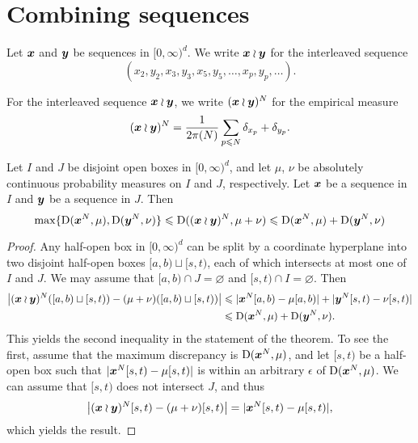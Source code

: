 \section{Combining sequences}

\begin{definition}
Let ${\boldsymbol x}$ and ${\boldsymbol y}$ be sequences in $[0,\infty)^d$. We write ${\boldsymbol x}\wr{\boldsymbol y}$ for 
the interleaved sequence 
\[
	(x_2,y_2,x_3,y_3,x_5,y_5,\dots,x_p,y_p,\dots) .
\]
\end{definition}

For the interleaved sequence ${\boldsymbol x}\wr{\boldsymbol y}$, we write $({\boldsymbol x}\wr{\boldsymbol y})^N$ for the 
empirical measure 
\[
	({\boldsymbol x}\wr{\boldsymbol y})^N = \frac{1}{2\pi(N)} \sum_{p\leqslant N} \delta_{x_p} + \delta_{y_p} .
\]

\begin{theorem}\label{thm:wreath-seq}
Let $I$ and $J$ be disjoint open boxes in $[0,\infty)^d$, and let $\mu$, 
$\nu$ be absolutely continuous probability measures on $I$ and $J$, 
respectively. Let ${\boldsymbol x}$ be a sequence in $I$ and ${\boldsymbol y}$ be a sequence in $J$. 
Then 
\[
	\max\{\operatorname{D}({\boldsymbol x}^N,\mu),\operatorname{D}({\boldsymbol y}^N,\nu)\} \leqslant \operatorname{D}(({\boldsymbol x}\wr{\boldsymbol y})^N, \mu+\nu) \leqslant \operatorname{D}({\boldsymbol x}^N,\mu) + \operatorname{D}({\boldsymbol y}^N,\nu)
\]
\end{theorem}
\begin{proof}
Any half-open box in $[0,\infty)^d$ can be split by a coordinate 
hyperplane into two disjoint half-open boxes $[a,b)\sqcup [s,t)$, each of which 
intersects at most one of $I$ and $J$. We may assume that 
$[a,b)\cap J=\varnothing$ and $[s,t)\cap I = \varnothing$. Then 
\begin{align*}
	\left| ({\boldsymbol x}\wr{\boldsymbol y})^N([a,b)\sqcup [s,t)) - (\mu+\nu)([a,b)\sqcup[s,t))\right| 
		&\leqslant |{\boldsymbol x}^N[a,b) - \mu[a,b)| + |{\boldsymbol y}^N[s,t) - \nu[s,t)| \\
		&\leqslant \operatorname{D}({\boldsymbol x}^N,\mu) + \operatorname{D}({\boldsymbol y}^N,\nu) .
\end{align*}
This yields the second inequality in the statement of the theorem. To see the 
first, assume that the maximum discrepancy is $\operatorname{D}({\boldsymbol x}^N,\mu)$, and let 
$[s,t)$ be a half-open box such that $|{\boldsymbol x}^N[s,t) - \mu[s,t)|$ is within an 
arbitrary $\epsilon$ of $\operatorname{D}({\boldsymbol x}^N,\mu)$. We can assume that $[s,t)$ does not 
intersect $J$, and thus 
\[
	\left|({\boldsymbol x}\wr{\boldsymbol y})^N[s,t) - (\mu+\nu)[s,t)\right| = |{\boldsymbol x}^N[s,t) - \mu[s,t)| ,
\]
which yields the result. 
\end{proof}
